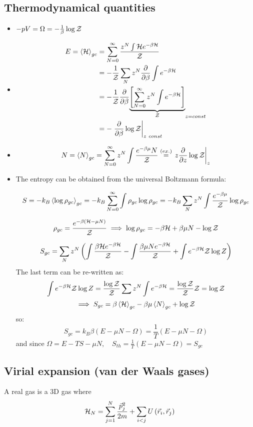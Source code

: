 \subsection{Thermodynamical quantities}
\begin{itemize}
    \item $-pV = \Omega = -\frac 1\beta \log \mathcal{Z}$
    \item \begin{align*}
    E = \left<\mathcal{H}\right>_{gc} &= \sum_{N=0}^\infty \frac{z^N\int \mathcal{H} e^{-\beta \mathcal{H}}}{\mathcal{Z}} \\ 
    &= -\frac 1{\mathcal{Z}} \sum_N z^N \frac{\partial}{\partial\beta} \int e^{-\beta \mathcal{H}} \\
    &= -\frac 1{\mathcal{Z}} \frac{\partial}{\partial\beta} {\underbrace{\left[\sum_{N=0}^\infty z^N \int e^{-\beta \mathcal{H}}\right]}_{\mathcal{Z}}}_{z=const} \\
    &= -\left.\frac{\partial}{\partial\beta}\log \mathcal{Z} \right|_{z\ const}
    \end{align*}
    \item $$N = \left<N\right>_{gc} = \sum_{N=0}^\infty z^N \int\frac {e^{-\beta \mu}N}{\mathcal{Z}} \stackrel{(ex.)}{=} \left.z\frac{\partial}{\partial z} \log \mathcal{Z}\right|_z $$
    \item The entropy can be obtained from the universal Boltzmann formula: 
    
    $$S = -k_B \left<\log\rho_{gc}\right>_{gc} = -k_B \sum_{N=0}^\infty \int \rho_{gc}\log \rho_{gc} = -k_B \sum_N z^N \int\frac{e^{-\beta\mu}}{\mathcal{Z}} \log \rho_{gc}$$
    
    $$\rho_{gc} = \frac {e^{-\beta(\mathcal{H}-\mu N)}}{\mathcal{Z}} \implies \log \rho_{gc} = -\beta \mathcal{H} + \beta \mu N - \log \mathcal{Z} $$
    
    $$
    S_{gc} = \sum_N z^N \left(\int\frac{\beta \mathcal{H} e^{-\beta\mathcal{H}}}{\mathcal{Z}} - \int \frac{\beta\mu N e^{-\beta \mathcal{H}}}{\mathcal{Z}} + \int {e^{-\beta \mathcal{H}}}\mathcal{Z} \log Z \right)
    $$
    The last term can be re-written as:
    $$\int {e^{-\beta \mathcal{H}}}\mathcal{Z} \log Z = \frac{\log \mathcal{Z}}{\mathcal{Z}} \sum z^N \int e^{-\beta \mathcal{H}} = \frac {\log\mathcal{Z}}{\mathcal{Z}} \mathcal{Z} = \log \mathcal{Z}$$
    $$\implies S_{gc} = \beta \left<\mathcal{H}\right>_{gc} - \beta \mu \left<N\right>_{gc} + \log \mathcal{Z}$$
    so:
    $$ S_{gc} = k_B\beta(E-\mu N - \Omega) = \frac 1T (E-\mu N - \Omega)$$
    and since $\Omega = E-TS -\mu N, \quad S_{th} = \frac1T(E-\mu N - \Omega) = S_{gc}$    
\end{itemize}
    
\subsection{Virial expansion (van der Waals gases)}
A real gas is a 3D gas where 
$$\mathcal{H}_N = \sum_{j=1}^N \frac{\vec p_j^2}{2m} + \sum_{i < j} U\left(\vec r_i,\vec r_j\right)$$

